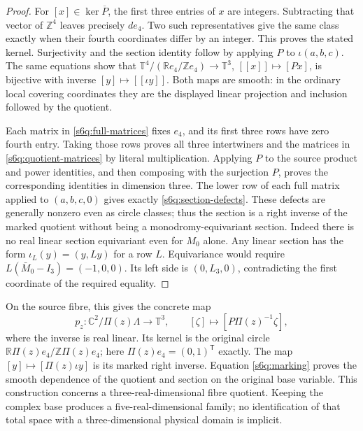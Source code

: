 \begin{proof}
For $[x]\in\ker\overline P$, the first three entries of $x$ are
integers. Subtracting that vector of $\mathbb Z^4$ leaves precisely
$de_4$. Two such representatives give the same class exactly when their
fourth coordinates differ by an integer. This proves the stated kernel.
Surjectivity and the section identity follow by applying $P$ to
$\iota(a,b,c)$. The same equations show that
$\mathbb T^4/(\mathbb Re_4/\mathbb Ze_4)\to\mathbb T^3$,
$[[x]]\mapsto[Px]$, is bijective with inverse $[y]\mapsto[[\iota y]]$.
Both maps are smooth: in the ordinary local covering coordinates they are
the displayed linear projection and inclusion followed by the quotient.

Each matrix in \eqref{s6q:full-matrices} fixes $e_4$, and its first three
rows have zero fourth entry. Taking those rows proves all three
intertwiners and the matrices in \eqref{s6q:quotient-matrices} by literal
multiplication. Applying $P$ to the source product and power identities,
and then composing with the surjection $P$, proves the corresponding
identities in dimension three. The lower row of each full matrix applied
to $(a,b,c,0)$ gives exactly \eqref{s6q:section-defects}. These defects
are generally nonzero even as circle classes; thus the section is a
right inverse of the marked quotient without being a monodromy-equivariant
section.
Indeed there is no real linear section equivariant even for $M_0$ alone.
Any linear section has the form $\iota_L(y)=(y,Ly)$ for a row $L$.
Equivariance would require
$L(\bar M_0-I_3)=(-1,0,0)$. Its left side is $(0,L_3,0)$,
contradicting the first coordinate of the required equality.
\end{proof}

On the source fibre, this gives the concrete map
\begin{equation}
 p_z:\mathbb C^2/\Pi(z)\Lambda\longrightarrow\mathbb T^3,
 \qquad [\zeta]\longmapsto[P\Pi(z)^{-1}\zeta],
 \label{s6q:actual-fibre-map}
\end{equation}
where the inverse is real linear. Its kernel is the original circle
$\mathbb R\Pi(z)e_4/\mathbb Z\Pi(z)e_4$; here
$\Pi(z)e_4=(0,1)^{\mathsf T}$ exactly. The map
$[y]\mapsto[\Pi(z)\iota y]$ is its marked right inverse.
Equation \eqref{s6q:marking} proves the smooth dependence of the quotient
and section on the original base variable. This construction concerns a
three-real-dimensional fibre quotient. Keeping the complex base produces
a five-real-dimensional family; no identification of that total space
with a three-dimensional physical domain is implicit.


